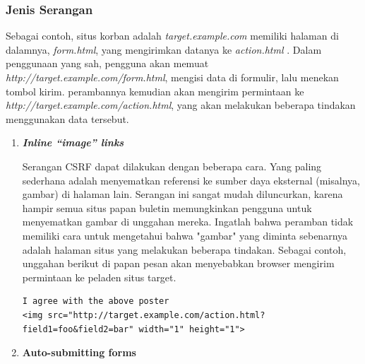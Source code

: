 \documentclass{article}
\begin{document}
\subsubsection{Jenis Serangan}
Sebagai contoh, situs korban adalah \textit{target.example.com} memiliki halaman di dalamnya, \textit{form.html}, yang mengirimkan datanya ke \textit{action.html} \cite{blatz2007csrf}. Dalam penggunaan yang sah, pengguna akan memuat \textit{http://target.example.com/form.html}, mengisi data di formulir, lalu menekan tombol kirim. perambannya kemudian akan mengirim permintaan ke \textit{http://target.example.com/action.html}, yang akan melakukan beberapa tindakan menggunakan data tersebut.
\begin{enumerate}
\item \textbf{\textit{Inline “image” links}}

Serangan CSRF dapat dilakukan dengan beberapa cara. Yang paling sederhana adalah menyematkan referensi ke sumber daya eksternal (misalnya, gambar) di halaman lain. Serangan ini sangat mudah diluncurkan, karena hampir semua situs papan buletin memungkinkan pengguna untuk menyematkan gambar di unggahan mereka. Ingatlah bahwa peramban tidak memiliki cara untuk mengetahui bahwa "gambar" yang diminta sebenarnya adalah halaman situs yang melakukan beberapa tindakan. Sebagai contoh, unggahan berikut di papan pesan akan menyebabkan browser mengirim permintaan ke peladen situs target.
\begin{lstlisting}[style=htmlcssjs]
I agree with the above poster
<img src="http://target.example.com/action.html?field1=foo&field2=bar" width="1" height="1">
\end{lstlisting}

\item \textbf{Auto-submitting forms}


\end{enumerate}
\end{document}

